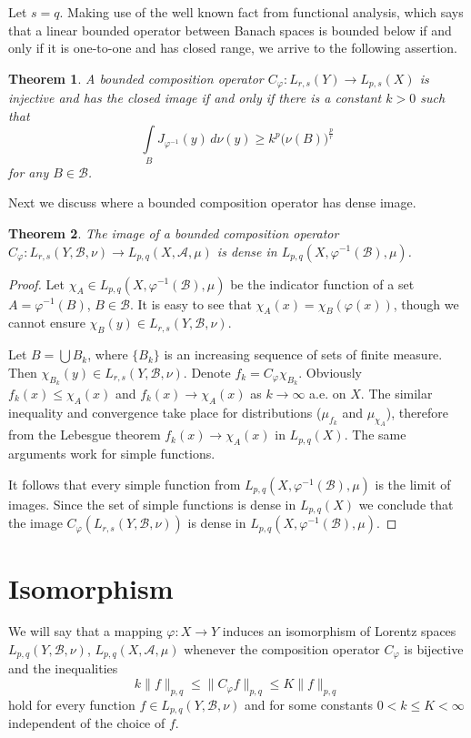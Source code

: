 \documentclass{birkjour}
\newtheorem{thm}{Theorem}[section]
\theoremstyle{definition}
\theoremstyle{remark}
\numberwithin{equation}{section}
\begin{document}
Let $s=q$. Making use of the well known fact from functional analysis,
which says that a linear bounded operator between Banach spaces 
is bounded below if and only if it is one-to-one and has closed range, 
we arrive to the following assertion.
\begin{thm}\label{theorem:closed_image}
A bounded composition operator $C_\varphi:L_{r,s}(Y)\to L_{p,s}(X)$ is injective and has the closed image
if and only if there is a constant $k>0$ such that
$$
\int\limits_BJ_{\varphi^{-1}}(y)\, d\nu(y) \geq k^p\big(\nu(B)\big)^{\frac{p}{r}}
$$
for any $B\in \mathcal B$. 
\end{thm}

Next we discuss where a bounded composition operator has dense image.
\begin{thm}\label{theorem:dense_image}
The image of a bounded composition operator 
$C_\varphi:L_{r,s}(Y, \mathcal B, \nu)\to L_{p,q}(X, \mathcal A, \mu)$ 
is dense in  $L_{p,q}(X, \varphi^{-1}(\mathcal B), \mu)$.
\end{thm}
\begin{proof}
Let $\chi_A\in L_{p,q}(X, \varphi^{-1}(\mathcal B), \mu)$ be the indicator function of a set $A=\varphi^{-1}(B)$,
$B\in\mathcal B$.
It is easy to see that  $\chi_A(x) = \chi_B(\varphi(x))$, though we cannot ensure  
$\chi_B(y)\in L_{r,s}(Y, \mathcal B, \nu)$.

Let $B = \bigcup B_k$, where $\{B_k\}$ is an increasing sequence of sets of finite measure.   
Then $\chi_{B_k}(y)\in L_{r,s}(Y, \mathcal B, \nu)$. Denote $f_k=C_\varphi\chi_{B_k}$.
Obviously $f_k(x)\leq \chi_A(x)$ and $f_k(x)\to \chi_A(x)$ as $k\to \infty$ a.e. on $X$.
The similar inequality and convergence take place for distributions ($\mu_{f_k}$ and $\mu_{\chi_A}$),
therefore from the Lebesgue theorem $f_k(x)\to \chi_A(x)$ in $L_{p,q}(X)$. 
The same arguments work for simple functions. 

It follows that every simple function from  $L_{p,q}(X, \varphi^{-1}(\mathcal B), \mu)$
is the limit of images.
Since the set of simple functions is dense in $L_{p,q}(X)$ we conclude that the image 
$C_\varphi(L_{r,s}(Y, \mathcal B, \nu))$ is dense in $L_{p,q}(X, \varphi^{-1}(\mathcal B), \mu)$. 
\end{proof}

\section{Isomorphism}\label{iso}
We will say  that a mapping $\varphi:X\to Y$ induces an isomorphism 
of Lorentz spaces $L_{p,q}(Y, \mathcal B, \nu)$, $L_{p,q}(X, \mathcal A, \mu)$
whenever the composition operator $C_\varphi$ is bijective and the inequalities 
\begin{equation}\label{bounded_below_above}
k\|f\|_{p,q} \leq \|C_\varphi f\|_{p,q}\leq K\|f\|_{p,q}
\end{equation}
hold for every function $f\in L_{p,q}(Y, \mathcal B, \nu)$
and for some constants $0<k\leq K<\infty$ independent of the choice of $f$. 
\end{document}
